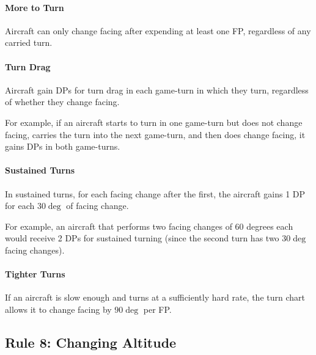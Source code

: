 \documentclass[10pt]{article}
\begin{document}
\paragraph{More to Turn} Aircraft can only change facing after expending at least one FP, regardless of any carried turn.

\paragraph{Turn Drag} Aircraft gain DPs for turn drag in each game-turn in which they turn, regardless of whether they change facing. 

For example, if an aircraft starts to turn in one game-turn but does not change facing, carries the turn into the next game-turn, and then does change facing, it gains DPs in both game-turns.

\paragraph{Sustained Turns} In sustained turns, for each facing change after the first, the aircraft gains 1 DP for each $30\deg$ of facing change. 

For example, an aircraft that performs two facing changes of 60 degrees each would receive 2 DPs for sustained turning (since the second turn has two $30\deg$ facing changes).

\paragraph{Tighter Turns} If an aircraft is slow enough and turns at a sufficiently hard rate, the turn chart allows it to change facing by $90\deg$ per FP. 

\subsection{Rule 8: Changing Altitude}
\end{document}
